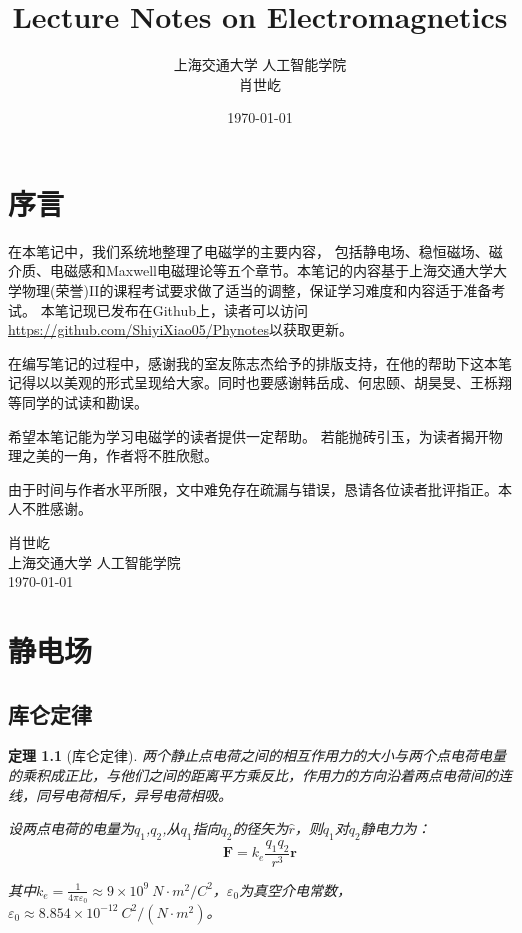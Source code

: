 \documentclass[12pt,a4paper,oneside]{report}
\title{\Huge\textbf{Lecture Notes on Electromagnetics}}
\author{\Large 上海交通大学 人工智能学院 \\
\Large 肖世屹}
\date{\today}
\newtheorem{theorem}{定理}[chapter]
\theoremstyle{definition}
\theoremstyle{remark}
\begin{document}
\maketitle
\thispagestyle{empty}
\clearpage
\chapter*{序言}

在本笔记中，我们系统地整理了电磁学的主要内容，
包括静电场、稳恒磁场、磁介质、电磁感和Maxwell电磁理论等五个章节。本笔记的内容基于上海交通大学大学物理(荣誉)II的课程考试要求做了适当的调整，保证学习难度和内容适于准备考试。
本笔记现已发布在Github上，读者可以访问\url{https://github.com/ShiyiXiao05/Phynotes}以获取更新。

在编写笔记的过程中，感谢我的室友陈志杰给予的排版支持，在他的帮助下这本笔记得以以美观的形式呈现给大家。同时也要感谢韩岳成、何忠颐、胡昊旻、王栎翔等同学的试读和勘误。

希望本笔记能为学习电磁学的读者提供一定帮助。
若能抛砖引玉，为读者揭开物理之美的一角，作者将不胜欣慰。

由于时间与作者水平所限，文中难免存在疏漏与错误，恳请各位读者批评指正。本人不胜感谢。
\bigskip
\begin{flushright}
肖世屹 \\
上海交通大学 人工智能学院 \\
\today
\end{flushright}
\clearpage

\tableofcontents
\clearpage


\chapter{静电场}
\section{库仑定律}

\begin{theorem}[库仑定律]
两个静止点电荷之间的相互作用力的大小与两个点电荷电量的乘积成正比，与他们之间的距离平方乘反比，作用力的方向沿着两点电荷间的连线，同号电荷相斥，异号电荷相吸。

设两点电荷的电量为$q_1$,$q_2$,从$q_1$指向$q_2$的径矢为$\hat{r}$，则$q_1$对$q_2$静电力为：
\[
\mathbf{F} = k_e \frac{q_1 q_2}{r^3}\mathbf{r}
\]

其中$k_e = \frac{1}{4\pi \varepsilon_0} \approx 9\times 10^9\ N\cdot m^2/C^2$，$\varepsilon_0$为真空介电常数，$\varepsilon_0 \approx 8.854\times 10^{-12}\ C^2/(N\cdot m^2)$。
\end{theorem}
\end{document}
